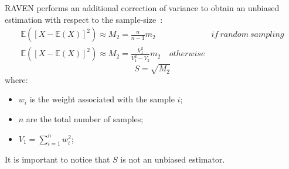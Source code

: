 RAVEN performs an additional correction of variance to obtain an unbiased estimation  with respect to the sample-size~\cite{RimoldiniUnbiased}:
\begin{equation}
\begin{matrix}
\mathbb{E}\left(\left[X - \mathbb{E}(X)\right]^{2}\right)  \approx M_{2} = \displaystyle \frac{n}{n-1}m_{2} & & if \: random \: sampling
\\
\mathbb{E}\left(\left[X - \mathbb{E}(X)\right]^{2}\right)  \approx M_{2} = \frac{V_{1}^{2}}{V_{1}^{2} - V_{2}}m_{2} & \: otherwise
\end{matrix}
\end{equation}
\begin{equation}
S = \sqrt{M_{2}} 
\end{equation}
where:
\begin{itemize}
  \item $w_{i}$ is the weight associated with the sample $i$;
  \item $n$ are the total number of samples;
  \item $V_{1} = \sum_{i=1}^{n} w_{i}^{2}$;
\end{itemize}
It is important to notice that $S$ is not an unbiased estimator.

